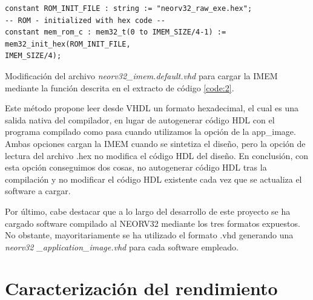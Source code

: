 \begin{code}
\begin{verbatim}
constant ROM_INIT_FILE : string := "neorv32_raw_exe.hex";
-- ROM - initialized with hex code --
constant mem_rom_c : mem32_t(0 to IMEM_SIZE/4-1) := mem32_init_hex(ROM_INIT_FILE, 
IMEM_SIZE/4);
\end{verbatim}
\caption{Modificación del archivo \textit{neorv32\_imem.default.vhd} para cargar la IMEM mediante la función descrita en el extracto de código \ref{code:2}.}
\label{code:3}
\end{code}

Este método propone leer desde VHDL un formato hexadecimal, el cual es una salida nativa del compilador, en lugar de autogenerar código HDL con el programa compilado como pasa cuando utilizamos la opción de la app\_image. 
Ambas opciones cargan la IMEM cuando se sintetiza el diseño, pero la opción de lectura del archivo .hex no modifica el código HDL del diseño. 
En conclusión, con esta opción conseguimos dos cosas, no autogenerar código HDL tras la compilación y no modificar el código HDL existente cada vez que se actualiza el software a cargar.

Por último, cabe destacar que a lo largo del desarrollo de este proyecto se ha cargado software compilado al NEORV32 mediante los tres formatos expuestos.
No obstante, mayoritariamente se ha utilizado el formato .vhd generando una \textit{neorv32   \_application\_image.vhd} para cada software empleado.

\section{Caracterización del rendimiento}

\label{Carac}


